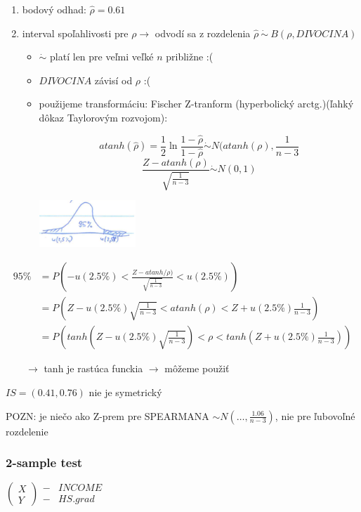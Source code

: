\documentclass[unknownkeysallowed]{article}
\begin{document}
\begin{enumerate}
\item bodový odhad: \underline{$\hat{\rho} = 0.61$}
\item interval spoľahlivosti pre $\rho \to$ odvodí sa z rozdelenia $\hat{\rho} ~\dot{\sim}~ B(\rho, DIVOCINA)$
	\begin{itemize}
	\item $\dot{\sim}$ platí len pre veľmi veľké $n$ približne :(
	\item $DIVOCINA$ závisí od $\rho$ :(
	\item použijeme transformáciu: Fischer Z-tranform (hyperbolický arctg.)(ľahký dôkaz Taylorovým rozvojom):
	\begin{multicols}{2}
	$$atanh(\hat{\rho}) = \frac{1}{2}\ln{\frac{1-\hat{\rho}}{1-\hat{\rho}}} \dot{\sim} N(atanh(\rho), \frac{1}{n-3}$$
	$$\frac{Z-atanh(\rho)}{\sqrt{\frac{1}{n-3}}} \dot{\sim} N(0,1)$$
	\columnbreak
	
	\includegraphics[width=0.3\textwidth]{imgs/obr25.png}
	\end{multicols}
	\end{itemize}
\end{enumerate}

\begin{align*}
95\% &= P(-u(2.5\%) < \frac{Z-atanh/\rho)}{\sqrt{\frac{1}{n-3}}} < u(2.5\%))\\
&= P(Z-u(2.5\%)\sqrt{\frac{1}{n-3}} < atanh(\rho) < Z+u(2.5\%)\frac{1}{n-3})\\
&= P(tanh(Z-u(2.5\%)\sqrt{\frac{1}{n-3}}) < \rho < tanh(Z+u(2.5\%)\frac{1}{n-3}))
\end{align*}

$\qquad \to$ tanh je rastúca funckia $\to$ môžeme použiť

\underline{$IS = (0.41, 0.76)$} nie je symetrický

POZN: je niečo ako Z-prem pre SPEARMANA $\sim N(\ldots, \frac{1.06}{n-3})$, nie pre ľubovoľné rozdelenie

\subsubsection*{2-sample test}
$\left(\begin{matrix}
  X\\
  Y
 \end{matrix}\right)\begin{matrix}
  - & INCOME\\
  - & HS.grad
 \end{matrix}$
 
\end{document}
